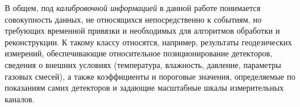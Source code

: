 %
%
%
В общем, под \emph{калибровочной информацией} в данной работе понимается
совокупность данных, не относящихся непосредственно к событиям, но
требующих временной привязки и необходимых для алгоритмов обработки и
реконструкции. К такому классу относятся, например, результаты геодезических
измерений, обеспечивающие относительное позиционирование детекторов,
сведения о внешних условиях (температура, влажность, давление, параметры
газовых смесей), а также коэффициенты и пороговые значения, определяемые
по показаниям самих детекторов и задающие масштабные шкалы
измерительных каналов.

